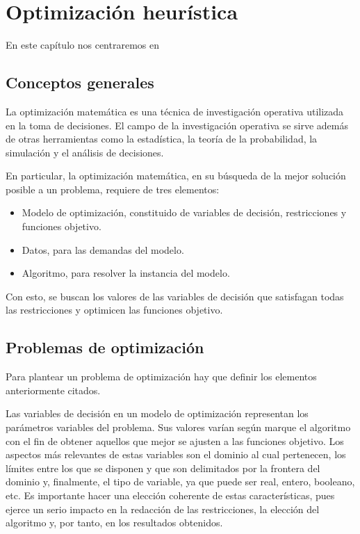 \chapter{Optimización heurística} \label{Capitulo 2}

En este capítulo nos centraremos en 

\section{Conceptos generales}
La optimización matemática es una técnica de investigación operativa utilizada en la toma de decisiones. El campo de la investigación operativa se sirve además de otras herramientas como la estadística, la teoría de la probabilidad, la simulación y el análisis de decisiones.

En particular, la optimización matemática, en su búsqueda de la mejor solución posible a un problema, requiere de tres elementos:
\begin{itemize}
     \item Modelo de optimización, constituido de variables de decisión, restricciones y funciones objetivo.
    \item Datos, para las demandas del modelo.
    \item Algoritmo, para resolver la instancia del modelo.
\end{itemize}
Con esto, se buscan los valores de las variables de decisión que satisfagan todas las restricciones y optimicen las funciones objetivo.

\section{Problemas de optimización}
Para plantear un problema de optimización hay que definir los elementos anteriormente citados.

Las variables de decisión en un modelo de optimización representan los parámetros variables del problema. Sus valores varían según marque el algoritmo con el fin de obtener aquellos que mejor se ajusten a las funciones objetivo.
Los aspectos más relevantes de estas variables son el dominio al cual pertenecen, los límites entre los que se disponen y que son delimitados por la frontera del dominio y, finalmente, el tipo de variable, ya que puede ser real, entero, booleano, etc.
Es importante hacer una elección coherente de estas características, pues ejerce un serio impacto en la redacción de las restricciones, la elección del algoritmo y, por tanto, en los resultados obtenidos.

